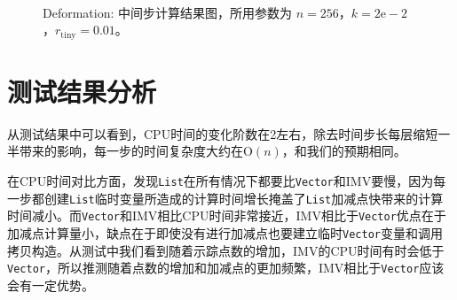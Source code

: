 \documentclass[a4paper,twoside]{ctexart}
\begin{document}
\begin{figure}[H]
{    }\\
    \caption{Deformation: 中间步计算结果图，所用参数为 $n=256$，$k=2\mathrm{e}-2$，$r_\mathrm{tiny}=0.01$。}
    \label{fig:deformation}
\end{figure}

\section{测试结果分析}
从测试结果中可以看到，CPU时间的变化阶数在2左右，除去时间步长每层缩短一半带来的影响，每一步的时间复杂度大约在$\mathrm{O}(n)$，和我们的预期相同。

在CPU时间对比方面，发现\texttt{List}在所有情况下都要比\texttt{Vector}和IMV要慢，因为每一步都创建\texttt{List}临时变量所造成的计算时间增长掩盖了\texttt{List}加减点快带来的计算时间减小。而\texttt{Vector}和IMV相比CPU时间非常接近，IMV相比于\texttt{Vector}优点在于加减点计算量小，缺点在于即使没有进行加减点也要建立临时\texttt{Vector}变量和调用拷贝构造。从测试中我们看到随着示踪点数的增加，IMV的CPU时间有时会低于\texttt{Vector}，所以推测随着点数的增加和加减点的更加频繁，IMV相比于\texttt{Vector}应该会有一定优势。
\end{document}
